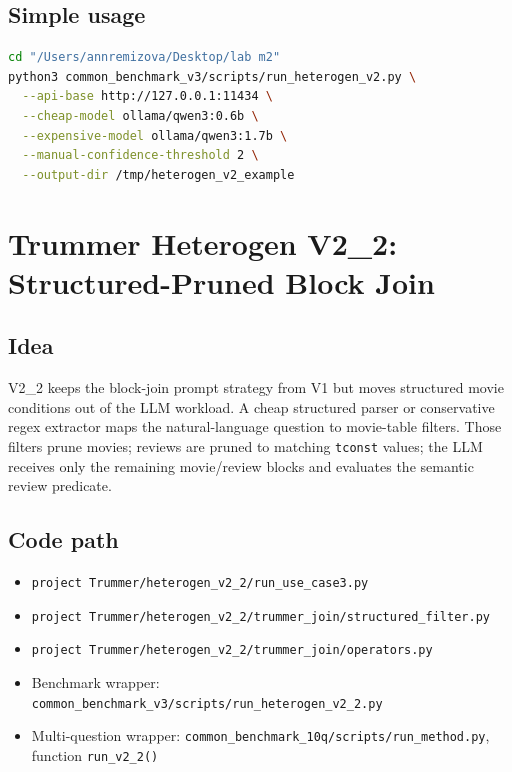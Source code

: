 \documentclass[11pt,oneside]{book}
\begin{document}
\section{Simple usage}
\begin{lstlisting}[language=bash]
cd "/Users/annremizova/Desktop/lab m2"
python3 common_benchmark_v3/scripts/run_heterogen_v2.py \
  --api-base http://127.0.0.1:11434 \
  --cheap-model ollama/qwen3:0.6b \
  --expensive-model ollama/qwen3:1.7b \
  --manual-confidence-threshold 2 \
  --output-dir /tmp/heterogen_v2_example
\end{lstlisting}
\chapter{Trummer Heterogen V2\_2: Structured-Pruned Block Join}
\section{Idea}
V2\_2 keeps the block-join prompt strategy from V1 but moves structured movie conditions out of the LLM workload. A cheap structured parser or conservative regex extractor maps the natural-language question to movie-table filters. Those filters prune movies; reviews are pruned to matching \texttt{tconst} values; the LLM receives only the remaining movie/review blocks and evaluates the semantic review predicate.
\section{Code path}
\begin{itemize}
\item \texttt{project Trummer/heterogen\_v2\_2/run\_use\_case3.py}
\item \texttt{project Trummer/heterogen\_v2\_2/trummer\_join/structured\_filter.py}
\item \texttt{project Trummer/heterogen\_v2\_2/trummer\_join/operators.py}
\item Benchmark wrapper: \texttt{common\_benchmark\_v3/scripts/run\_heterogen\_v2\_2.py}
\item Multi-question wrapper: \texttt{common\_benchmark\_10q/scripts/run\_method.py},
function \texttt{run\_v2\_2()}
\end{itemize}
\end{document}

